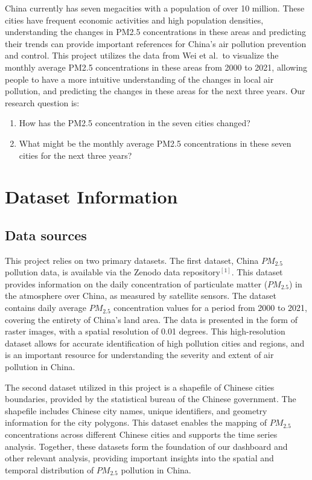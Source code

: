 \documentclass[
  12pt,
]{article}
\providecommand{\tightlist}{%
  \setlength{\itemsep}{0pt}\setlength{\parskip}{0pt}}
\begin{document}
China currently has seven megacities with a population of over 10
million. These cities have frequent economic activities and high
population densities, understanding the changes in PM2.5 concentrations
in these areas and predicting their trends can provide important
references for China's air pollution prevention and control. This
project utilizes the data from Wei et al.~to visualize the monthly
average PM2.5 concentrations in these areas from 2000 to 2021, allowing
people to have a more intuitive understanding of the changes in local
air pollution, and predicting the changes in these areas for the next
three years. Our research question is:

\begin{enumerate}
\def\labelenumi{\arabic{enumi}.}
\tightlist
\item
  How has the PM2.5 concentration in the seven cities changed?
\item
  What might be the monthly average PM2.5 concentrations in these seven
  cities for the next three years?
\end{enumerate}

\newpage

\hypertarget{dataset-information}{%
\section{Dataset Information}\label{dataset-information}}

\hypertarget{data-sources}{%
\subsection{Data sources}\label{data-sources}}

This project relies on two primary datasets. The first dataset, China
\(PM_{2.5}\) pollution data, is available via the Zenodo data
repository\(^{[1]}\). This dataset provides information on the daily
concentration of particulate matter (\(PM_{2.5}\)) in the atmosphere
over China, as measured by satellite sensors. The dataset contains daily
average \(PM_{2.5}\) concentration values for a period from 2000 to
2021, covering the entirety of China's land area. The data is presented
in the form of raster images, with a spatial resolution of 0.01 degrees.
This high-resolution dataset allows for accurate identification of high
pollution cities and regions, and is an important resource for
understanding the severity and extent of air pollution in China.

The second dataset utilized in this project is a shapefile of Chinese
cities boundaries, provided by the statistical bureau of the Chinese
government. The shapefile includes Chinese city names, unique
identifiers, and geometry information for the city polygons. This
dataset enables the mapping of \(PM_{2.5}\) concentrations across
different Chinese cities and supports the time series analysis.
Together, these datasets form the foundation of our dashboard and other
relevant analysis, providing important insights into the spatial and
temporal distribution of \(PM_{2.5}\) pollution in China.
\end{document}

